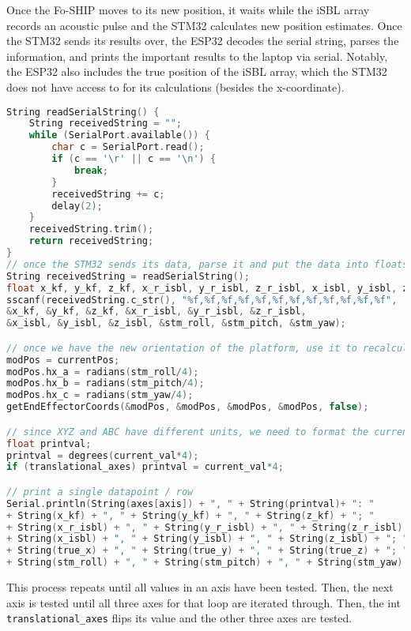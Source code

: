 \documentclass[12pt,a4paper]{report}
\begin{document}
Once the Fo-SHIP moves to its new position, it waits while the iSBL array records an acoustic pulse and the STM32 calculates new position estimates. Once the STM32 sends its results over, the ESP32 decodes the serial string, parses the information, and prints the important results to the laptop via serial. Notably, the ESP32 also includes the true position of the iSBL array, which the STM32 does not have access to for its calculations (besides the x-coordinate).

\begin{lstlisting}[language=C++]
String readSerialString() {
	String receivedString = "";
	while (SerialPort.available()) {
		char c = SerialPort.read();
		if (c == '\r' || c == '\n') {
			break;
		}
		receivedString += c;
		delay(2);
	}
	receivedString.trim();
	return receivedString;
}
// once the STM32 sends its data, parse it and put the data into floats
String receivedString = readSerialString();
float x_kf, y_kf, z_kf, x_r_isbl, y_r_isbl, z_r_isbl, x_isbl, y_isbl, z_isbl;
sscanf(receivedString.c_str(), "%f,%f,%f,%f,%f,%f,%f,%f,%f,%f,%f,%f", 
&x_kf, &y_kf, &z_kf, &x_r_isbl, &y_r_isbl, &z_r_isbl, 
&x_isbl, &y_isbl, &z_isbl, &stm_roll, &stm_pitch, &stm_yaw);

// once we have the new orientation of the platform, use it to recalculate the true end effector pos
modPos = currentPos;
modPos.hx_a = radians(stm_roll/4);
modPos.hx_b = radians(stm_pitch/4);
modPos.hx_c = radians(stm_yaw/4);
getEndEffectorCoords(&modPos, &modPos, &modPos, &modPos, false);

// since XYZ and ABC have different units, we need to format the current value differently
float printval;
printval = degrees(current_val*4);
if (translational_axes) printval = current_val*4;

// print a single datapoint / row
Serial.println(String(axes[axis]) + ", " + String(printval)+ ": "
+ String(x_kf) + ", " + String(y_kf) + ", " + String(z_kf) + "; " 
+ String(x_r_isbl) + ", " + String(y_r_isbl) + ", " + String(z_r_isbl) + "; "
+ String(x_isbl) + ", " + String(y_isbl) + ", " + String(z_isbl) + "; "
+ String(true_x) + ", " + String(true_y) + ", " + String(true_z) + "; "
+ String(stm_roll) + ", " + String(stm_pitch) + ", " + String(stm_yaw) + ";");
\end{lstlisting}

This process repeats until all values in an axis have been tested. Then, the next axis is tested until all three axes for that loop are iterated through. Then, the int \verb|translational_axes| flips its value and the other three axes are tested.
\end{document}
